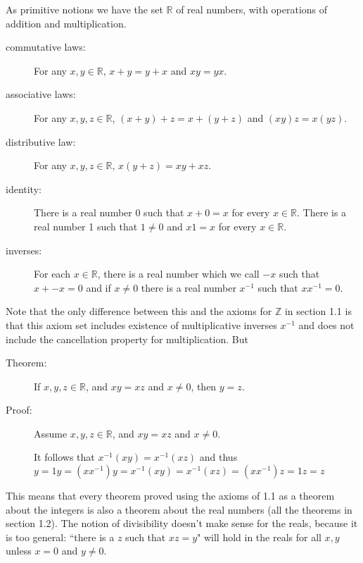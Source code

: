 \documentclass[12pt]{article}
\begin{document}
As primitive notions we have the set $\mathbb R$ of real numbers, with operations of addition and multiplication.

\begin{description}

\item[commutative laws:]  For any $x,y \in \mathbb R$, $x+y=y+x$ and $xy = yx$.

\item[associative laws:]  For any $x,y,z \in \mathbb R$, $(x+y)+z=x+(y+z)$ and $(xy)z=x(yz)$.

\item[distributive law:]  For any $x,y,z \in \mathbb R$, $x(y+z) = xy+xz$.

\item[identity:]  There is a real number 0 such that $x+0=x$ for every $x\in \mathbb R$.  There is a real number 1 such that $1 \neq 0$ and $x1 =x$ for every $x\in \mathbb R$.

\item[inverses:]  For each $x \in \mathbb R$, there is a real number which we call $-x$ such that $x+ -x=0$ and if $x \neq 0$ there is a real number $x^{-1}$ such that $xx^{-1}=0$.

\end{description}

Note that the only difference between this and the axioms for $\mathbb Z$ in section 1.1 is that this axiom set includes existence of multiplicative inverses $x^{-1}$ and does not include the cancellation property for multiplication.  But

\begin{description}

\item[Theorem:]  If $x,y,z \in \mathbb R$, and $xy = xz$ and $x \neq 0$, then $y=z$.

\item[Proof:]  Assume $x,y,z \in \mathbb R$, and $xy = xz$ and $x \neq 0$.

It follows that $x^{-1}(xy) = x^{-1}(xz)$ and thus $y = 1y = (xx^{-1})y = x^{-1}(xy) = x^{-1}(xz) = (xx^{-1})z = 1z = z$

\end{description}

This means that every theorem proved using the axioms of 1.1 as a theorem about the integers is also a theorem about the real numbers (all the theorems in section 1.2).  The notion of divisibility doesn't make sense for the reals, because it is too general:  ``there is a $z$ such that $xz=y$"  will hold in the reals for all $x,y$ unless $x = 0$ and $y \neq 0$.
\end{document}
